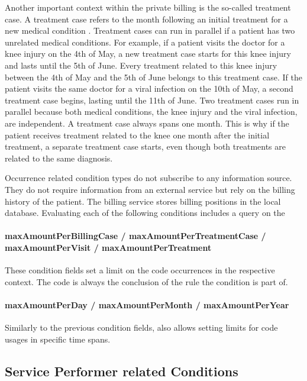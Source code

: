 Another important context within the private billing is the so-called treatment case.
A treatment case refers to the month following an initial treatment for a new medical condition \cite{bruck1998kommentar}.
Treatment cases can run in parallel if a patient has two unrelated medical conditions.
For example, if a patient visits the doctor for a knee injury on the 4th of May, a new treatment case starts for this knee injury and lasts until the 5th of June.
Every treatment related to this knee injury between the 4th of May and the 5th of June belongs to this treatment case.
If the patient visits the same doctor for a viral infection on the 10th of May, a second treatment case begins, lasting until the 11th of June.
Two treatment cases run in parallel because both medical conditions, the knee injury and the viral infection, are independent.
A treatment case always spans one month.
This is why if the patient receives treatment related to the knee one month after the initial treatment, a separate treatment case starts, even though both treatments are related to the same diagnosis.

Occurrence related condition types do not subscribe to any information source.
They do not require information from an external service but rely on the billing history of the patient.
The billing service stores billing positions in the local database.
Evaluating each of the following conditions includes a query on the

\paragraph{maxAmountPerBillingCase / maxAmountPerTreatmentCase / maxAmountPerVisit / maxAmountPerTreatment}
These condition fields set a limit on the code occurrences in the respective context.
The code is always the conclusion of the rule the condition is part of.


\paragraph{maxAmountPerDay / maxAmountPerMonth / maxAmountPerYear}
Similarly to the previous condition fields, \RL also allows setting limits for code usages in specific time spans.

\subsection{Service Performer related Conditions}\label{subsec:service-performer-related-conditions}

